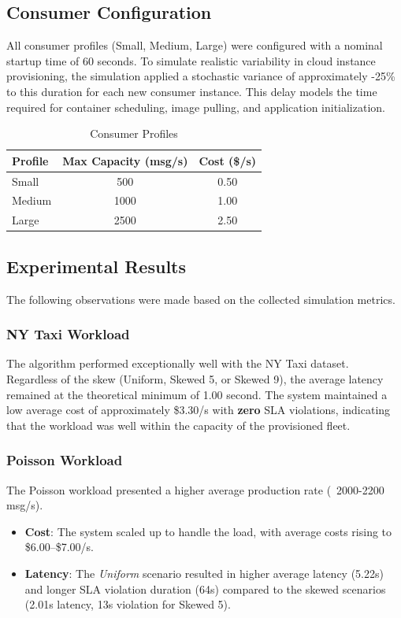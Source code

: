 ﻿\documentclass[conference]{IEEEtran}
\begin{document}
\subsection{Consumer Configuration}
All consumer profiles (Small, Medium, Large) were configured with a nominal startup time of 60 seconds. To simulate realistic variability in cloud instance provisioning, the simulation applied a stochastic variance of approximately -25\% to this duration for each new consumer instance. This delay models the time required for container scheduling, image pulling, and application initialization.

\begin{table}[H]
\centering
\caption{Consumer Profiles}
\label{tab:consumer_profiles}
\begin{tabular}{lcc}
\toprule
\textbf{Profile} & \textbf{Max Capacity (msg/s)} & \textbf{Cost (\$/s)} \\
\midrule
Small & 500 & 0.50 \\
Medium & 1000 & 1.00 \\
Large & 2500 & 2.50 \\
\bottomrule
\end{tabular}
\end{table}

\subsection{Experimental Results}
The following observations were made based on the collected simulation metrics.

\subsubsection{NY Taxi Workload}
The algorithm performed exceptionally well with the NY Taxi dataset. Regardless of the skew (Uniform, Skewed 5, or Skewed 9), the average latency remained at the theoretical minimum of 1.00 second. The system maintained a low average cost of approximately \$3.30/s with \textbf{zero} SLA violations, indicating that the workload was well within the capacity of the provisioned fleet.

\subsubsection{Poisson Workload}
The Poisson workload presented a higher average production rate (~2000-2200 msg/s).
\begin{itemize}
    \item \textbf{Cost}: The system scaled up to handle the load, with average costs rising to \$6.00--\$7.00/s.
    \item \textbf{Latency}: The \textit{Uniform} scenario resulted in higher average latency (5.22s) and longer SLA violation duration (64s) compared to the skewed scenarios (2.01s latency, 13s violation for Skewed 5).
\end{itemize}
\end{document}
